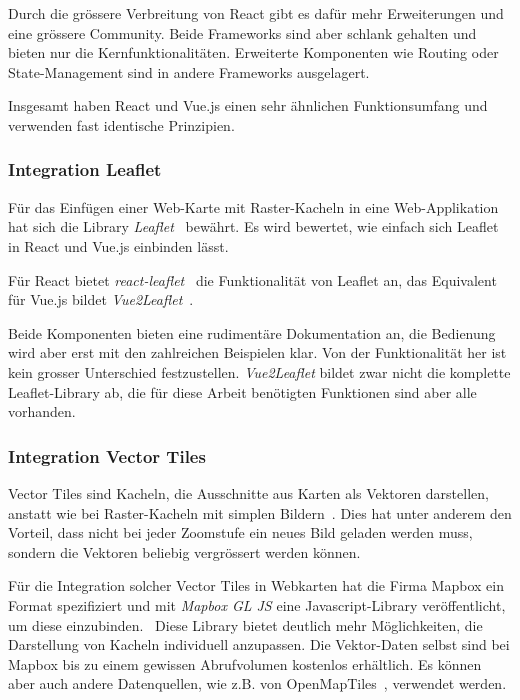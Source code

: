 Durch die grössere Verbreitung von React gibt es dafür mehr Erweiterungen und eine grössere Community.
Beide Frameworks sind aber schlank gehalten und bieten nur die Kernfunktionalitäten.
Erweiterte Komponenten wie Routing oder State-Management sind in andere Frameworks ausgelagert.

Insgesamt haben React und Vue.js einen sehr ähnlichen Funktionsumfang und verwenden fast identische Prinzipien.

\subsubsection{Integration Leaflet}
\label{Analyse Framework:Integration Leaflet}

Für das Einfügen einer Web-Karte mit Raster-Kacheln in eine Web-Applikation hat sich die Library \emph{Leaflet}~\cite{leaflet} bewährt.
Es wird bewertet, wie einfach sich Leaflet in React und Vue.js einbinden lässt.

Für React bietet \emph{react-leaflet}~\cite{react-leaflet} die Funktionalität von Leaflet an, das Equivalent für Vue.js bildet \emph{Vue2Leaflet}~\cite{vue2leaflet}.

Beide Komponenten bieten eine rudimentäre Dokumentation an, die Bedienung wird aber erst mit den zahlreichen Beispielen klar.
Von der Funktionalität her ist kein grosser Unterschied festzustellen.
\emph{Vue2Leaflet} bildet zwar nicht die komplette Leaflet-Library ab, die für diese Arbeit benötigten Funktionen sind aber alle vorhanden.


\subsubsection{Integration Vector Tiles}
\label{Analyse Framework:Integration Vector Tiles}

Vector Tiles sind Kacheln, die Ausschnitte aus Karten als Vektoren darstellen, anstatt wie bei Raster-Kacheln mit simplen Bildern~\cite{geometalab_vectortiles}.
Dies hat unter anderem den Vorteil, dass nicht bei jeder Zoomstufe ein neues Bild geladen werden muss, sondern die Vektoren beliebig vergrössert werden können.

Für die Integration solcher Vector Tiles in Webkarten hat die Firma Mapbox ein Format spezifiziert und mit \emph{Mapbox GL JS} eine Javascript-Library veröffentlicht, um diese einzubinden.~\cite{mapbox_gl_js}
Diese Library bietet deutlich mehr Möglichkeiten, die Darstellung von Kacheln individuell anzupassen.
Die Vektor-Daten selbst sind bei Mapbox bis zu einem gewissen Abrufvolumen kostenlos erhältlich.
Es können aber auch andere Datenquellen, wie z.B. von OpenMapTiles~\cite{openmaptiles}, verwendet werden.

